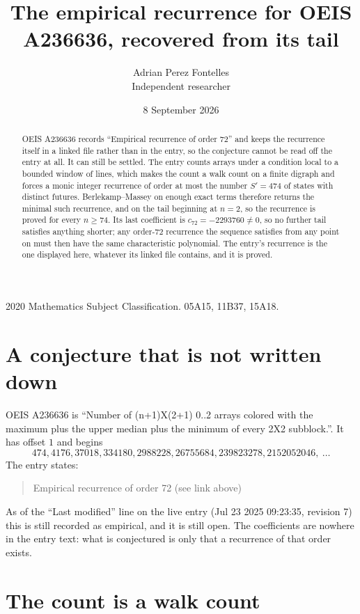 \documentclass[11pt,a4paper]{article}
\title{The empirical recurrence for OEIS A236636, recovered from its tail}
\author{Adrian Perez Fontelles\\ \small Independent researcher}
\date{8 September 2026}
\theoremstyle{plain}
\theoremstyle{definition}
\begin{document}
\maketitle

\begin{abstract}
OEIS A236636 records ``Empirical recurrence of order $72$'' and keeps the recurrence itself in
a linked file rather than in the entry, so the conjecture cannot be read off the entry at all.
It can still be settled. The entry counts arrays under a condition local to a bounded window of
lines, which makes the count a walk count on a finite digraph and forces a monic integer
recurrence of order at most the number $S'=474$ of states with distinct futures. Berlekamp--Massey on
enough exact terms therefore returns the minimal such recurrence, and on the tail beginning at $n=2$, so the recurrence is proved for every $n\ge74$.
Its last coefficient is $c_{72}=-2293760\neq0$, so no further tail satisfies anything
shorter; any order-$72$ recurrence the sequence satisfies from any point on must then have
the same characteristic polynomial. The entry's recurrence is the one displayed here, whatever
its linked file contains, and it is proved.
\end{abstract}

\noindent\small 2020 Mathematics Subject Classification. 05A15, 11B37, 15A18.\normalsize

\section{A conjecture that is not written down}

OEIS A236636 is ``Number of (n+1)X(2+1) 0..2 arrays colored with the maximum plus the upper median plus the minimum of every 2X2 subblock.''. It has offset $1$ and begins
\[
474, 4176, 37018, 334180, 2988228, 26755684, 239823278, 2152052046,\ \dots
\]
The entry states:
\begin{quote}
Empirical recurrence of order 72 (see link above)
\end{quote}
As of the ``Last modified'' line on the live entry (Jul 23 2025 09:23:35, revision 7)
this is still recorded as empirical, and it is still open. The coefficients are nowhere in the
entry text: what is conjectured is only that a recurrence of that order exists.

\section{The count is a walk count}
\end{document}

